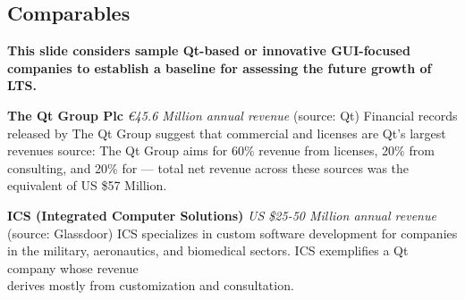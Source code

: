 
\begin{frame}{}
\section{Comparables}
\vspace{.5em}	

{\Large%
\hspace*{-2pt}\begin{minipage}{\textwidth}
\vspace{-11pt}


		


{\hspace{1.5em}\begin{minipage}[l]{.85\textwidth}\Large\centering\color{slidePartHeadColor} 	
{\LARGE \textbf{This slide considers sample Qt-based 
or innovative GUI-focused companies to establish a baseline for assessing 
	the future growth of LTS.}}
\vspace{.7em}	
\end{minipage}}
\vspace{.8em}

{\fontsize{18}{16}\selectfont \setlength{\leftmargini}{30pt}\begin{enumerate}
\dmitem \textbf{The Qt Group Plc} 
\textit{\euro{}45.6 Million annual revenue} (source: Qt)
Financial records \\released by The Qt Group suggest that commercial 
 and  licenses 
are Qt's largest revenues source: The Qt Group 
aims for 60\% revenue from licenses, 20\% from 
consulting, and 20\% for  
--- total net revenue across these sources was 
the equivalent of US \$57 Million.\vspace{20pt}

\dmitem \textbf{ICS (Integrated Computer Solutions)} 
\textit{US \$25-50 Million annual revenue} (source: Glassdoor)
ICS specializes in custom software development 
for companies in the military, aeronautics, and 
biomedical sectors.  ICS exemplifies a 
Qt company whose revenue \\derives mostly from 
customization and consultation.\vspace{20pt}


\end{enumerate}}
\end{minipage}}
\end{frame}
